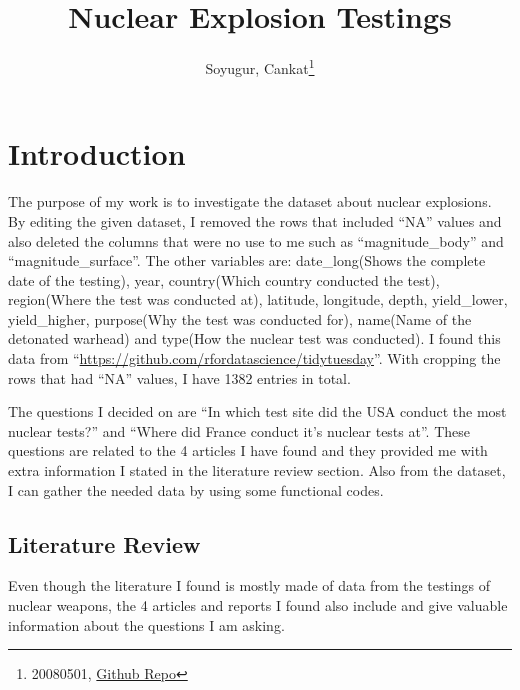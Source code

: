 \documentclass[
  12pt,
]{article}
\title{Nuclear Explosion Testings}
\author{Soyugur, Cankat\footnote{20080501, \href{https://github.com/cnktxd/Midterm1.git}{Github Repo}}}
\date{}
\begin{document}
\maketitle

\hypertarget{introduction}{%
\section{Introduction}\label{introduction}}

The purpose of my work is to investigate the dataset about nuclear explosions. By editing the given dataset, I removed the rows that included ``NA'' values and also deleted the columns that were no use to me such as ``magnitude\_body'' and ``magnitude\_surface''. The other variables are: date\_long(Shows the complete date of the testing), year, country(Which country conducted the test), region(Where the test was conducted at), latitude, longitude, depth, yield\_lower, yield\_higher, purpose(Why the test was conducted for), name(Name of the detonated warhead) and type(How the nuclear test was conducted). I found this data from ``\url{https://github.com/rfordatascience/tidytuesday}''. With cropping the rows that had ``NA'' values, I have 1382 entries in total.

The questions I decided on are ``In which test site did the USA conduct the most nuclear tests?'' and ``Where did France conduct it's nuclear tests at''. These questions are related to the 4 articles I have found and they provided me with extra information I stated in the literature review section. Also from the dataset, I can gather the needed data by using some functional codes.

\hypertarget{literature-review}{%
\subsection{Literature Review}\label{literature-review}}

Even though the literature I found is mostly made of data from the testings of nuclear weapons, the 4 articles and reports I found also include and give valuable information about the questions I am asking.
\end{document}

